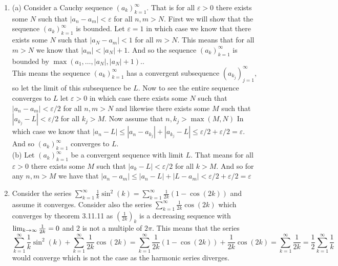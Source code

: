 \documentclass[12pt]{amsart}
\begin{document}
\begin{enumerate}
\item (a) Consider a Cauchy sequence $(a_k)_{k=1}^{\infty}$. That is for all $\varepsilon>0$ there exists some $N$
such that $|a_n-a_m|<\varepsilon$ for all $n,m>N$. First we will show that the sequence $(a_k)_{k=1}^{\infty}$ is bounded. 
Let $\varepsilon=1$ in which case we know that there exists some $N$ such that $|a_N-a_m|<1$ for all $m>N$. This means that 
for all $m>N$ we know that $|a_m|<|a_N|+1$. And so the sequence $(a_k)_{k=1}^{\infty}$ is bounded by $\max(a_1,\dots,|a_N|,|a_N|+1)$..\\
This means the sequence $(a_k)_{k=1}^{\infty}$ has a convergent subsequence $(a_{k_j})_{j=1}^{\infty}$, so let the limit of this subsequence be $L$. 
Now to see the entire sequence converges to $L$ let $\varepsilon>0$ in which case there exists some $N$ such that $|a_n-a_m|<\varepsilon/2$ 
for all $n,m>N$ and likewise there exists some $M$ such that $|a_{k_j}-L|<\varepsilon/2$ for all $k_j>M$. Now assume that $n,k_j>\max(M,N)$ 
In which case we know that $|a_n-L|\leq |a_n-a_{k_j}|+|a_{k_j}-L|\leq \varepsilon/2+\varepsilon/2=\varepsilon$. And so $(a_k)_{k=1}^{\infty}$ 
converges to $L$.\\
(b) Let $(a_k)_{k=1}^{\infty}$ be a convergent sequence with limit $L$. That means for all $\varepsilon>0$ there exists some $M$ such that 
$|a_k-L|<\varepsilon/2$ for all $k>M$. And so for any $n,m>M$ we have that $|a_n-a_m|\leq |a_n-L|+|L-a_m|< \varepsilon/2+\varepsilon/2=\varepsilon$\\

\item Consider the series $\sum_{k=1}^\infty \frac{1}{k}\sin^2(k)=\sum_{k=1}^\infty \frac{1}{2k}(1-\cos(2k))$ and assume it converges. Consider 
also the series $\sum_{k=1}^\infty \frac{1}{2k}\cos(2k)$ which converges by theorem 3.11.11 as ${\left(\frac{1}{2k}\right)}_k$ is a decreasing sequence with
 $\lim_{k\rightarrow\infty}\frac{1}{2k}=0$ and $2$ is not a multiple of $2\pi$. This means that the series 
 \[\sum_{k=1}^\infty \frac{1}{k}\sin^2(k)+\sum_{k=1}^\infty \frac{1}{2k}\cos(2k)=\sum_{k=1}^\infty \frac{1}{2k}(1-\cos(2k))+\frac{1}{2k}\cos(2k)
 =\sum_{k=1}^\infty \frac{1}{2k}=\frac{1}{2}\sum_{k=1}^\infty \frac{1}{k}\]
would converge which is not the case as the harmonic series diverges.
\end{enumerate}
\end{document}
